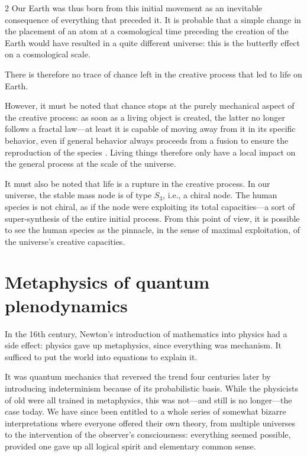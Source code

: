 \begin{multicols}{2}
	Our Earth was thus born from this initial movement as an inevitable consequence of everything that preceded it. It is probable that a simple change in the placement of an atom at a cosmological time preceding the creation of the Earth would have resulted in a quite different universe: this is the butterfly effect on a cosmological scale.
	
	There is therefore no trace of chance left in the creative process that led to life on Earth.
	
	However, it must be noted that chance stops at the purely mechanical aspect of the creative process: as soon as a living object is created, the latter no longer follows a fractal law—at least it is capable of moving away from it in its specific behavior, even if general behavior always proceeds from a fusion to ensure the reproduction of the species \cite{queirosconde2003entropie}. Living things therefore only have a local impact on the general process at the scale of the universe.
	
	It must also be noted that life is a rupture in the creative process. In our universe, the stable mass node is of type $S_3$, i.e., a chiral node. The human species is not chiral, as if the node were exploiting its total capacities—a sort of super-synthesis of the entire initial process. From this point of view, it is possible to see the human species as the pinnacle, in the sense of maximal exploitation, of the universe's creative capacities.
	
	\section{Metaphysics of quantum plenodynamics}
	
	In the 16th century, Newton's introduction of mathematics into physics had a side effect: physics gave up metaphysics, since everything was mechanism. It sufficed to put the world into equations to explain it.
	
	It was quantum mechanics that reversed the trend four centuries later by introducing indeterminism because of its probabilistic basis. While the physicists of old were all trained in metaphysics, this was not—and still is no longer—the case today. We have since been entitled to a whole series of somewhat bizarre interpretations where everyone offered their own theory, from multiple universes to the intervention of the observer's consciousness: everything seemed possible, provided one gave up all logical spirit and elementary common sense.
	

\end{multicols}
